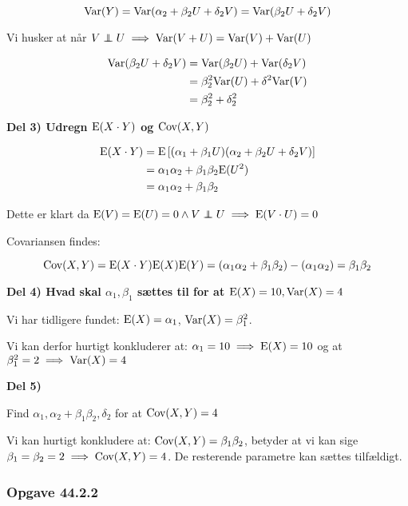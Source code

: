 \begin{equation}
    \text{Var}(Y) = \text{Var}(\alpha_2 + \beta_2 U + \delta_2 V) = \text{Var}(\beta_2 U + \delta_2 V)
\end{equation}

Vi husker at når $V \independent U \implies \Var( V + U) = \Var(V) + \Var(U)$

\begin{align}
    \text{Var}(\beta_2 U + \delta_2 V) &= \text{Var}(\beta_2 U) + \text{Var}(\delta_2 V) \\
    &= \beta_2^2\text{Var}(U) + \delta^2\text{Var}(V)  \\ 
    &= \beta_2^2 + \delta_2^2
\end{align}

\textbf{Del 3) Udregn $\text{E}(X \cdot Y)$ og $\text{Cov}(X,Y)$}

\begin{align}
    \text{E}(X \cdot Y) &= \text{E}\left[ (\alpha_1 + \beta_1 U) (\alpha_2 + \beta_2 U + \delta_2  V) \right]  \\
    &= \alpha_1 \alpha_2 + \beta_1 \beta_2 \text{E}(U^2) \\
    &= \alpha_1 \alpha_2 + \beta_1 \beta_2
\end{align}

Dette er klart da  $\E(V) = \E(U) = 0 \land V \independent U \implies \E(V \cdot U) = 0$

Covariansen findes:

\begin{equation}
    \text{Cov}(X,Y) = \text{E}(X\cdot Y) \text{E}(X)\text{E}(Y) = (\alpha_1 \alpha_2 + \beta_1 \beta_2) - (\alpha_1\alpha_2) = \beta_1\beta_2
\end{equation}

\textbf{Del 4) Hvad skal $\alpha_1, \beta_1$ sættes til for at $\text{E}(X) = 10 , \text{Var}(X) = 4$}

Vi har tidligere fundet: $\text{E}(X) = \alpha_1$, $\text{Var}(X) = \beta_1^2$.

Vi kan derfor hurtigt konkluderer at: $\alpha_1 = 10 \implies \text{E}(X) = 10$ og at $\beta_1^2 = 2 \implies \text{Var}(X) = 4$

\textbf{Del 5)}

Find $\alpha_1, \alpha_2 + \beta_1\beta_2, \delta_2$ for at $\text{Cov}(X, Y) = 4$

Vi kan hurtigt konkludere at: $\text{Cov}(X,Y) = \beta_1 \beta_2$, betyder at vi kan sige $\beta_1 = \beta_2 = 2 \implies \text{Cov}(X,Y) = 4$. De resterende parametre kan sættes tilfældigt.

\subsubsection{Opgave 44.2.2}

